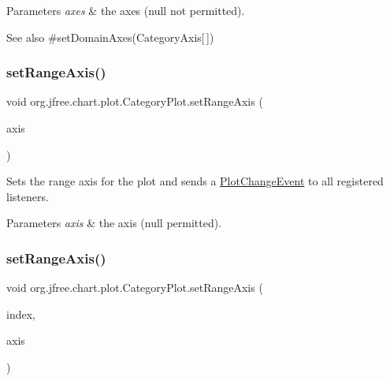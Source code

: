 \begin{DoxyParams}{Parameters}
{\em axes} & the axes ({\ttfamily null} not permitted).\\
\hline
\end{DoxyParams}
\begin{DoxySeeAlso}{See also}
\#set\+Domain\+Axes(\+Category\+Axis\mbox{[}$\,$\mbox{]}) 
\end{DoxySeeAlso}
\mbox{\label{classorg_1_1jfree_1_1chart_1_1plot_1_1_category_plot_a82087ffb92884b8ce553f430d2fb4ffd}} 
\subsubsection{\texorpdfstring{set\+Range\+Axis()}{setRangeAxis()}\hspace{0.1cm}{\footnotesize\ttfamily [1/3]}}
{\footnotesize\ttfamily void org.\+jfree.\+chart.\+plot.\+Category\+Plot.\+set\+Range\+Axis (\begin{DoxyParamCaption}\item[{\mbox{\hyperlink{classorg_1_1jfree_1_1chart_1_1axis_1_1_value_axis}{Value\+Axis}}}]{axis }\end{DoxyParamCaption})}

Sets the range axis for the plot and sends a \mbox{\hyperlink{}{Plot\+Change\+Event}} to all registered listeners.


\begin{DoxyParams}{Parameters}
{\em axis} & the axis ({\ttfamily null} permitted). \\
\hline
\end{DoxyParams}
\mbox{\label{classorg_1_1jfree_1_1chart_1_1plot_1_1_category_plot_ab32de3218b4bc8a5d724b5e3129d43f3}} 
\subsubsection{\texorpdfstring{set\+Range\+Axis()}{setRangeAxis()}\hspace{0.1cm}{\footnotesize\ttfamily [2/3]}}
{\footnotesize\ttfamily void org.\+jfree.\+chart.\+plot.\+Category\+Plot.\+set\+Range\+Axis (\begin{DoxyParamCaption}\item[{int}]{index,  }\item[{\mbox{\hyperlink{classorg_1_1jfree_1_1chart_1_1axis_1_1_value_axis}{Value\+Axis}}}]{axis }\end{DoxyParamCaption})}

